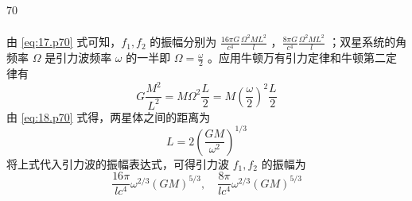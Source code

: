 \begin{solution}{70}
\begin{subsolution}
\begin{align}
        \end{align}
        由 \eqref{eq:17.p70} 式可知，$f_{1}, f_{2}$ 的振幅分别为 $\frac{16\pi G}{c^{4}}\frac{\Omega^{2} M L^{2}}{l}$ ，$\frac{8\pi G}{c^{4}}\frac{\Omega^{2} M L^{2}}{l}$ ；双星系统的角频率 $\Omega$ 是引力波频率 $\omega$ 的一半即 $\Omega = \frac{\omega}{2}$ 。应用牛顿万有引力定律和牛顿第二定律有
        \begin{equation}
            G\frac{M^{2}}{L^{2}} = M\Omega^{2}\frac{L}{2} = M\left(\frac{\omega}{2}\right)^{2}\frac{L}{2} \label{eq:18.p70}
        \end{equation}
        由 \eqref{eq:18.p70} 式得，两星体之间的距离为
        \begin{equation}
            L = 2\left(\frac{G M}{\omega^{2}}\right)^{1/3} \label{eq:19.p70}
        \end{equation}
        将上式代入引力波的振幅表达式，可得引力波 $f_{1}, f_{2}$ 的振幅为
        \begin{equation}
            \frac{16\pi}{l c^{4}} \omega^{2/3}(G M)^{5/3},\quad \frac{8\pi}{l c^{4}} \omega^{2/3}(G M)^{5/3} \label{eq:20.p70}
        \end{equation}
    \end{subsolution}
\end{solution}